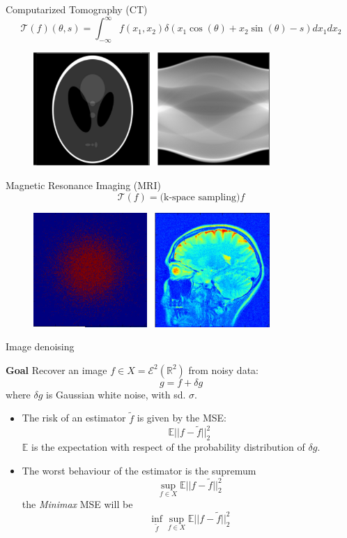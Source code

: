\begin{frame}{Computarized Tomography (CT)}
$$
\mathcal{T}(f) (\theta,s) = \int_{-\infty}^{\infty}f(x_1,x_2)\delta(x_1\cos(\theta)+x_2\sin(\theta)-s)dx_1dx_2
$$

\begin{figure}
\centering
\includegraphics[width=0.8\textwidth]{./Images/CT.png}
\end{figure}
\end{frame}

\begin{frame}{Magnetic Resonance Imaging (MRI)}
$$
\mathcal{T}(f)= \text{(k-space sampling)} f
$$
\begin{figure}
\centering
\includegraphics[width=0.8\textwidth]{./Images/MRI.jpg}
\end{figure}
\end{frame}

\begin{frame}{Image denoising}
\begin{block}{\textbf{Goal}}
 Recover an image $f\in X= \mathcal{E}^2(\mathbb{R}^2)$ from noisy data:
$$
g = f+\delta g
$$
where $\delta g$ is Gaussian white noise, with sd. $\sigma$.
\end{block}

\pause
\bigskip
\begin{itemize}
\item The risk of an estimator $\tilde{f}$ is given by the MSE:
$$
\mathbb{E}||f-\tilde{f}||_2^2
$$
$\mathbb{E}$ is the expectation with respect of the probability distribution of $\delta g$.
\pause
\bigskip
\item The worst behaviour of the estimator is the supremum
$$
\sup_{f\in X} \mathbb{E}||f-\tilde{f}||_2^2
$$
the \textit{Minimax} MSE will be
$$
\inf_{\tilde{f}}\sup_{f\in X}\mathbb{E}||f-\tilde{f}||^2_2
$$

\end{itemize}
\end{frame}

